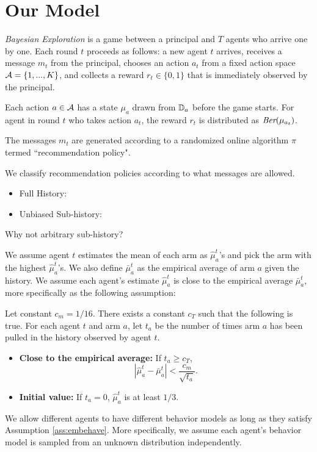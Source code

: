 \section{Our Model}
\label{sec:model}

\emph{Bayesian Exploration} is a game between a principal and $T$ agents who arrive one by one. Each round $t$ proceeds as follows: a new agent $t$ arrives, receives a message $m_t$ from the principal, chooses an action $a_t$ from a fixed action space $\mathcal{A} = \{1,...,K\}$, and collects a reward $r_t\in \{0,1\}$ that is immediately observed by the principal. 

Each action $a \in \mathcal{A}$ has a state $\mu_a$ drawn from $\mathbb{D}_a$ before the game starts. For agent in round $t$ who takes action $a_t$, the reward $r_t$ is distributed as $\emph{Ber}(\mu_{a_t})$.  

The messages $m_t$ are generated according to a randomized online algorithm $\pi$ termed ``recommendation policy".

 We classify recommendation policies according to what messages are allowed. 
\begin{itemize}
\item Full History: 
\item Unbiased Sub-history: 
\end{itemize}

\begin{remark}
Why not arbitrary sub-history?
\end{remark}

 We assume agent $t$ estimates the mean of each arm as $\hat{\mu}_a^t$'s and pick the arm with the highest $\hat{\mu}_a^t$'s. We also define $\bar{\mu}_a^t$ as the empirical average of arm $a$ given the history. We assume each agent's estimate $\hat{\mu}_a^t$ is close to the empirical average $\bar{\mu}_a^t$, more specifically as the following assumption:
\begin{assumption}
\label{ass:embehave}
Let constant $c_m = 1/16$. There exists a constant $c_T$ such that the following is true. For each agent $t$ and arm $a$, let $t_a$ be the number of times arm $a$ has been pulled in the history observed by agent $t$. 
\begin{itemize}
\item \textbf{Close to the empirical average:} If $t_a \geq c_T$, 
\[
|\hat{\mu}^t_a - \bar{\mu}^t_a | < \frac{c_m}{\sqrt{t_a}}.
\]
\item \textbf{Initial value:} If $t_a = 0$, $\hat{\mu}^t_a$ is at least $1/3$. 
\end{itemize}
\end{assumption}

We allow different agents to have different behavior models as long as they satisfy Assumption \ref{ass:embehave}. More specifically, we assume each agent's behavior model is sampled from an unknown distribution independently. 
